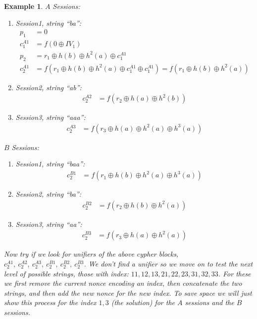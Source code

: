 \documentclass[11pt,twoside,a4paper]{article}
\newtheorem{example}{Example}
\begin{document}
{\begin{example}
	\noindent
	$A$ Sessions:
	\begin{enumerate}
		\item Session1, string ``ba'':
		\begin{align*}
		p_1 &= 0\\
		c^{A1}_1 &= f(0 \oplus IV_{1})\\
		p_2 &= r_1 \oplus h(b) \oplus h^2(a) \oplus c^{A1}_1\\
		c^{A1}_2 &= f(r_1 \oplus h(b) \oplus h^2(a) \oplus c^{A1}_1 \oplus c^{A1}_1) = f(r_1 \oplus h(b) \oplus h^2(a))
		\end{align*}
		\item Session2, string ``ab'':
		\begin{align*}
			c^{A2}_2 &=f(r_2 \oplus h(a) \oplus h^2(b))
		\end{align*}
		\item Session3, string ``aaa'':
		\begin{align*}
			c^{A3}_2 &=f(r_3 \oplus h(a) \oplus h^2(a) \oplus h^3(a))
		\end{align*}
	\end{enumerate}
	
	\noindent
	$B$ Sessions:
\begin{enumerate}
	\item Session1, string ``baa'':
	\begin{align*}
	c^{B1}_2 &= f(r_1 \oplus h(b) \oplus h^2(a) \oplus h^3(a))
	\end{align*}
	\item Session2, string ``ba'':
	\begin{align*}
	c^{B2}_2 &= f(r_2 \oplus h(b) \oplus h^2(a))
	\end{align*}
	\item Session3, string ``aa'':
	\begin{align*}
	c^{B3}_2 &= f(r_3 \oplus h(a) \oplus h^2(a))
	\end{align*}
\end{enumerate}
 
Now try if we look for unifiers of the above cypher blocks, 
$c^{A1}_2, ~c^{A2}_2, ~c^{A3}_2, ~c^{B1}_2, ~c^{B2}_2, ~c^{B3}_2$.
We don't find a unifier so we move on to test the next level of
possible strings, those with index: $11, 12, 13, 21, 22, 23, 31, 32, 33$. For these we first remove the current nonce encoding an index, 
then concatenate the two strings, and then add the new nonce for the
new index.  To save space we will just show this process for 
the index $1,3$ (the solution) for the $A$ sessions and the $B$ sessions.


\end{example}}
\end{document}

